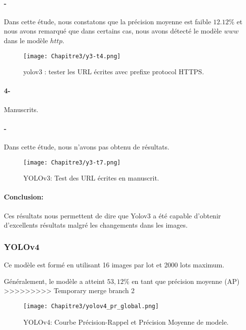            \paragraph{-} Dans cette étude, nous constatons que  la précision moyenne  est faible $12.12\%$ et nous avons remarqué que dans certains cas, nous avons détecté le modèle $www$ dans le modèle $http$.
           
           \begin{figure}[H]
               \centering
                \texttt{[image: Chapitre3/y3-t4.png]}
                \caption{yolov3 : tester les URL écrites avec prefixe protocol HTTPS.}
                \label{y3_t4}
                \end{figure}


           \paragraph{4-} Manuscrits.
           \paragraph{-} Dans cette étude, nous n'avons pas obtenu de résultats.

           \begin{figure}[H]
               \centering
                \texttt{[image: Chapitre3/y3-t7.png]}
                \caption{YOLOv3: Test des URL écrites en manuscrit.}
                \label{y3_t7}
                \end{figure}

           \paragraph{Conclusion:} Ces résultats nous permettent de dire que Yolov3 a été capable d'obtenir d'excellents résultats malgré les changements dans les images.  
           
           
                

          \subsubsection{YOLOv4}
          Ce modèle est formé en utilisant 16 images par lot et 2000 lots maximum.

          Généralement, le modèle a atteint $53,12\%$ en tant que précision moyenne (AP)
>>>>>>>>> Temporary merge branch 2
          \begin{figure}[H]
                    \centering
                    \texttt{[image: Chapitre3/yolov4\_pr\_global.png]}
                    \caption{YOLOv4: Courbe Précision-Rappel et Précision Moyenne de modele.}
                    \label{y4_pr}
                    \end{figure}
               
